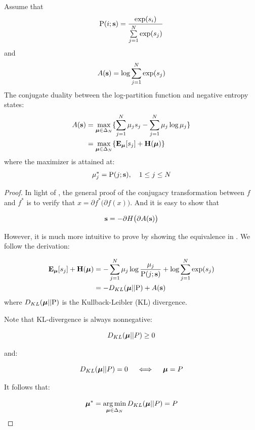 \begin{lem} \label{lem::conj_dual}
  Assume that
  $$\mathrm{P}(i; \mathbf{s}) = \frac{\exp(s_i)}{\sum\limits_{j=1}^N \exp(s_j)}$$
  and
  $$A(\mathbf{s}) = \log \sum\limits_{j = 1}^N \exp(s_j)$$
  The conjugate duality between the log-partition function and negative entropy
  states:
  \begin{align}
    A(\mathbf{s}) &= \max\limits_{\boldsymbol{\mu} \in \Delta_N}
                    \{ \sum\limits_{j=1}^N \mu_j s_j -
                       \sum\limits_{j=1}^N \mu_j \log \mu_j \} \nonumber \\
           &= \max\limits_{\boldsymbol{\mu} \in \Delta_N}
                    \{ \mathbf{E}_{\boldsymbol{\mu}} [s_j] + \mathbf{H}(\boldsymbol{\mu}) \} \label{eq::conj_dual}
  \end{align}
  where the maximizer is attained at:
  \begin{align}
    \mu_j^* = \mathrm{P}(j; \mathbf{s}), \quad 1 \le j \le N \label{eq::conj_dual_sol}
  \end{align}
\end{lem}
\begin{proof}

  In light of , the general proof of the
  conjugacy transformation between $f$ and $f^*$ is to verify that $x = \partial
  f^* \big( \partial f(x) \big)$. And it is easy to show that

  $$\mathbf{s} = -\partial H \big(\partial A (\mathbf{s}) \big)$$

  However, it is much more intuitive to prove by showing the equivalence in
  . We follow the derivation:

  \begin{align*}
    \mathbf{E}_{\boldsymbol{\mu}}[s_j] + \mathbf{H}(\boldsymbol{\mu})
      &= -\sum\limits_{j=1}^N \mu_j \log \frac{\mu_j }{ \mathrm{P}(j; \mathbf{s}) } +
          \log\sum\limits_{j=1}^N \exp(s_j) \nonumber \\
      &= -D_{KL}(\boldsymbol{\mu} || \mathrm{P}) + A(\mathbf{s})
  \end{align*}
where $D_{KL}(\boldsymbol{\mu} || \mathrm{P})$ is the Kullback-Leibler (KL) divergence.

Note that KL-divergence is always nonnegative:

$$D_{KL}(\boldsymbol{\mu} || P) \ge 0$$

and:

$$D_{KL}(\boldsymbol{\mu} || P) = 0  \quad\iff\quad \boldsymbol{\mu} = P $$

It follows that:

$$\boldsymbol{\mu}^* = \operatorname*{arg\,min}\limits_{\boldsymbol{\mu} \in \Delta_N} D_{KL}(\boldsymbol{\mu} || P) = P$$

\end{proof}

